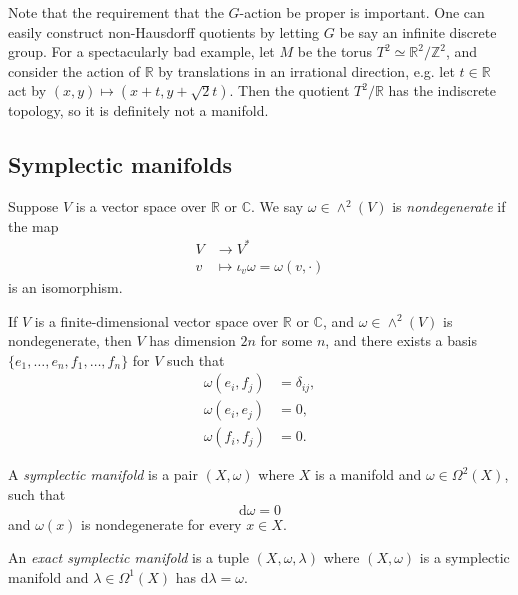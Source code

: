 \documentclass[12pt,letterpaper,reqno]{article}
\numberwithin{equation}{section}
\newcommand{\R}{\ensuremath{\mathbb R}}
\newcommand{\C}{\ensuremath{\mathbb C}}
\newcommand{\Z}{\ensuremath{\mathbb Z}}
\newcommand{\de}{\mathrm{d}}
\newcommand{\ti}[1]{\textit{#1}}
\begin{document}
Note that the requirement that the $G$-action be proper is 
important. One 
can easily construct non-Hausdorff quotients by letting $G$ be say
an infinite discrete group.
For a spectacularly bad example,
let $M$ be the torus $T^2 \simeq \R^2 / \Z^2$, and consider
the action of $\R$ by translations in an irrational direction,
e.g. let $t \in \R$ act by $(x,y) \mapsto (x+t,y+\sqrt{2}t)$. 
Then the quotient $T^2 / \R$ has the indiscrete topology,
so it is definitely not a manifold.


\subsection{Symplectic manifolds}

\begin{defn} \label{def:nondegenerate-skew-pairing}
Suppose $V$ is a vector space over $\R$ or $\C$.
We say $\omega \in \wedge^2(V)$ is \ti{nondegenerate}
if the map
\begin{align}
  V &\to V^* \\
  v &\mapsto \iota_v \omega = \omega(v,\cdot)
\end{align}
is an isomorphism.
\end{defn}

\begin{prop} 
\label{prop:standard-nondegenerate-skew-pairing}
If $V$ is a finite-dimensional vector space over $\R$ or $\C$, and
$\omega \in \wedge^2(V)$ is nondegenerate, then $V$ has 
dimension $2n$ for some $n$, and there
exists a basis $\{e_1, \dots, e_n, f_1, \dots, f_n\}$ for $V$
such that
\begin{align}
\omega(e_i, f_j) &= \delta_{ij}, \\
\omega(e_i, e_j) &= 0, \\
\omega(f_i, f_j) &= 0.
\end{align}
\end{prop}

\begin{defn} \label{def:symplectic-manifold}
A \ti{symplectic manifold} is a pair $(X,\omega)$
where $X$ is a manifold and
$\omega \in \Omega^2(X)$, such that
\begin{equation}
  \de \omega = 0
\end{equation}
and $\omega(x)$ is nondegenerate for every $x \in X$.
\end{defn}

\begin{defn}
An \ti{exact symplectic manifold} is a tuple $(X,\omega,\lambda)$
where $(X,\omega)$ is a symplectic manifold and $\lambda \in \Omega^1(X)$ has $\de \lambda = \omega$.
\end{defn}
\end{document}

